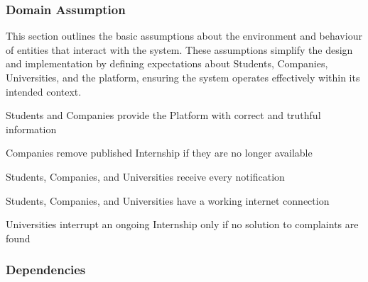 \subsubsection{Domain Assumption}
This section outlines the basic assumptions about the environment and behaviour of entities that interact with the system. These assumptions simplify the design and implementation by defining expectations about Students, Companies, Universities, and the platform, ensuring the system operates effectively within its intended context.
\begin{enumerate}[label={\color{titleColor}[D\arabic*]}]
    \item Students and Companies provide the Platform with correct and truthful information
    \item Companies remove published Internship if they are no longer available
    \item Students, Companies, and Universities receive every notification
    \item Students, Companies, and Universities have a working internet connection
    \item Universities interrupt an ongoing Internship only if no solution to complaints are found
\end{enumerate}

\subsubsection{Dependencies}